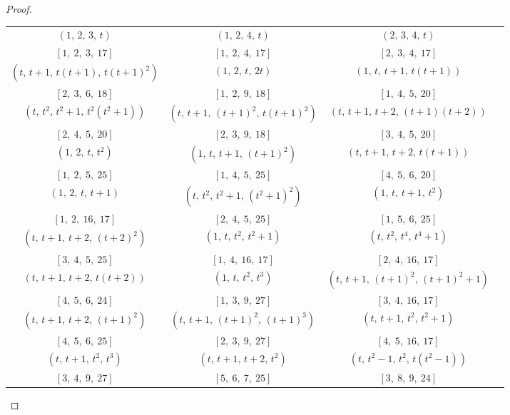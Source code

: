 \documentclass[conference]{IEEEtran}
\begin{document}
\begin{proof}
\begin{table}[ht!]
\setlength{\tabcolsep}{1.7pt}
\centering
\footnotesize
\begin{tabular}{|*{4}{c|}}
\hline
$\left(1,\,2,\,3,\,t\right)$ & $\left(1,\,2,\,4,\,t\right)$ & $\left(2,\,3,\,4,\,t\right)$\\
$[1,\ 2,\ 3,\ 17]$ & $[1,\ 2,\ 4,\ 17]$ & $[2,\ 3,\ 4,\ 17]$\\\hline
$\left(t,\,t{+}1,\,t\left(t{+}1\right),\,t(t{+}1)^2\right)$ & $\left(1,\,2,\,t,\,2t\right)$ & $\left(1,\,t,\,t{+}1,\,t(t{+}1)\right)$\\
$[2,\ 3,\ 6,\ 18]$ & $[1,\ 2,\ 9,\ 18]$ & $[1,\ 4,\ 5,\ 20]$\\\hline
$\left(t,\,t^2,\,t^2{+}1,\,t^2\left(t^2{+}1\right)\right)$ & $\left(t,\,t{+}1,\,(t{+}1)^2,\,t(t{+}1)^2\right)$ & $\left(t,\,t{+}1,\,t{+}2,\,(t{+}1)(t{+}2)\right)$\\
$[2,\ 4,\ 5,\ 20]$ & $[2,\ 3,\ 9,\ 18]$ & $[3,\ 4,\ 5,\ 20]$\\\hline
$\left(1,\,2,\,t,\,t^2\right)$ & $\left(1,\,t,\,t{+}1,\,(t{+}1)^2\right)$ & $\left(t,\,t{+}1,\,t{+}2,\,t(t{+}1)\right)$\\
$[1,\ 2,\ 5,\ 25]$ & $[1,\ 4,\ 5,\ 25]$ & $[4,\ 5,\ 6,\ 20]$\\\hline
$\left(1,\,2,\,t,\,t{+}1\right)$ & $\left(t,\,t^2,\,t^2{+}1,\,\left(t^2{+}1\right)^2\right)$ & $\left(1,\,t,\,t{+}1,\,t^2\right)$\\
$[1,\ 2,\ 16,\ 17]$ & $[2,\ 4,\ 5,\ 25]$ & $[1,\ 5,\ 6,\ 25]$\\\hline
$\left(t,\,t{+}1,\,t{+}2,\,(t{+}2)^2\right)$ & $\left(1,\,t,\,t^2,\,t^2{+}1\right)$ & $\left(t,\,t^2,\,t^4,\,t^4{+}1\right)$\\
$[3,\ 4,\ 5,\ 25]$ & $[1,\ 4,\ 16,\ 17]$ & $[2,\ 4,\ 16,\ 17]$\\\hline
$\left(t,\,t{+}1,\,t{+}2,\,t(t{+}2)\right)$ & $\left(1,\,t,\,t^2,\,t^3\right)$ & $\left(t,\,t{+}1,\,(t{+}1)^2,\,(t{+}1)^2{+}1\right)$\\
$[4,\ 5,\ 6,\ 24]$ & $[1,\ 3,\ 9,\ 27]$ & $[3,\ 4,\ 16,\ 17]$\\\hline
$\left(t,\,t{+}1,\,t{+}2,\,(t{+}1)^2\right)$ & $\left(t,\,t{+}1,\,(t{+}1)^2,\,(t{+}1)^3\right)$ & $\left(t,\,t{+}1,\,t^2,\,t^2{+}1\right)$\\
$[4,\ 5,\ 6,\ 25]$ & $[2,\ 3,\ 9,\ 27]$ & $[4,\ 5,\ 16,\ 17]$\\\hline
$\left(t,\,t{+}1,\,t^2,\,t^3\right)$ & $\left(t,\,t{+}1,\,t{+}2,\,t^2\right)$ & $\left(t,\,t^2{-}1,\,t^2,\,t\left(t^2{-}1\right)\right)$\\
$[3,\ 4,\ 9,\ 27]$ & $[5,\ 6,\ 7,\ 25]$ & $[3,\ 8,\ 9,\ 24]$\\\hline

\end{tabular}
\end{table}
\end{proof}
\end{document}
